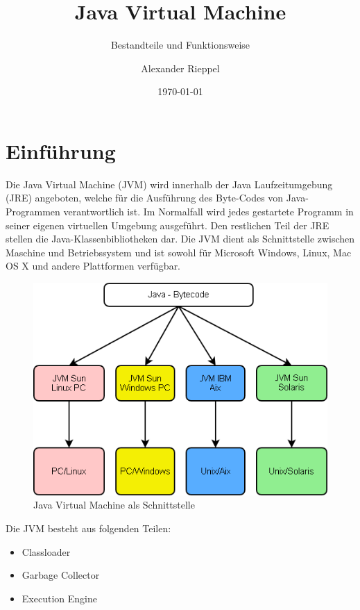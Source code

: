\documentclass[a4paper,14pt]{scrreprt}
\begin{document}
\author{Alexander Rieppel} %
\title{Java Virtual Machine} %
\subject{FT-Ausarbeitung} %
\subtitle{Bestandteile und Funktionsweise} %
\date{\today} %
\publishers{5AHITT} %

\maketitle
\tableofcontents
 

\chapter{Einführung}
Die Java Virtual Machine (JVM) wird innerhalb der Java Laufzeitumgebung (JRE) angeboten, welche für die Ausführung des Byte-Codes von Java-Programmen verantwortlich ist. Im Normalfall wird jedes gestartete Programm in seiner eigenen virtuellen Umgebung ausgeführt. Den restlichen Teil der JRE stellen die Java-Klassenbibliotheken dar. Die JVM dient als Schnittstelle zwischen Maschine und Betriebssystem und ist sowohl für Microsoft Windows, Linux, Mac OS X und andere  Plattformen verfügbar. 
\begin{figure}[h!]
\centering
\includegraphics[width=0.8\linewidth]{./Java-jvm}
\caption[Java Virtual Machine als Schnittstelle]{Java Virtual Machine als Schnittstelle}
\label{fig:Java-jvm}
\end{figure}\newpage
Die JVM besteht aus folgenden Teilen:
\begin{itemize}
\item Classloader
\item Garbage Collector
\item Execution Engine
\end{itemize}
\end{document}
